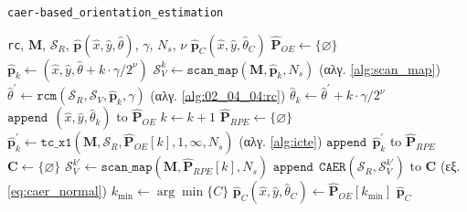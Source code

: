 \begin{algorithm}[!h]
  \caption{\texttt{caer-based\_orientation\_estimation}}
  \begin{spacing}{1.5}
  \begin{algorithmic}[1]
    \REQUIRE \texttt{rc}, $\bm{M}$, $\mathcal{S}_R$, $\hat{\bm{p}}(\hat{x}, \hat{y}, \hat{\theta})$, $\gamma$, $N_s$, $\nu$
    \ENSURE $\hat{\bm{p}}_C(\hat{x}, \hat{y}, \hat{\theta}_C)$
    \STATE {}$\hat{\bm{P}}_{OE} \leftarrow \{\varnothing\}$
      \STATE $\hat{\bm{p}}_k \leftarrow (\hat{x}, \hat{y}, \hat{\theta} + k \cdot \gamma/2^\nu)$
      \STATE $\mathcal{S}_V^k \leftarrow \texttt{scan\_map}(\bm{M}, \hat{\bm{p}}_k, N_s)$ \hfill (αλγ. \ref{alg:scan_map})
      \STATE $\hat{\theta}^\prime \leftarrow \texttt{rcm}(\mathcal{S}_R, \mathcal{S}_V, \hat{\bm{p}}_k, \gamma)$ \hfill (αλγ. \ref{alg:02_04_04:rc})
      \STATE $\hat{\theta}_k \leftarrow \hat{\theta}^\prime + k \cdot \gamma/2^\nu$
      \STATE $\texttt{append} \ \ (\hat{x}, \hat{y}, \hat{\theta}_k)$ to $\hat{\bm{P}}_{OE}$
      \STATE $k \leftarrow k + 1$
    \ENDFOR {}
    \STATE {}$\hat{\bm{P}}_{RPE} \leftarrow \{\varnothing\}$
      \STATE $\hat{\bm{p}}_k^\prime \leftarrow \texttt{tc\_x1}(\bm{M}, \mathcal{S}_R, \hat{\bm{P}}_{OE}[k], 1, \infty, N_s)$ \hfill (αλγ. \ref{alg:icte})
      \STATE $\texttt{append} \ \ \hat{\bm{p}}_k^\prime$ to $\hat{\bm{P}}_{RPE}$
    \ENDFOR{}
    \STATE {}$\bm{C} \leftarrow \{\varnothing\}$
      \STATE $\mathcal{S}_V^{k \prime} \leftarrow \texttt{scan\_map}(\bm{M}, \hat{\bm{P}}_{RPE}[k], N_s)$
      \STATE $\texttt{append} \ \ \texttt{CAER}(\mathcal{S}_R, \mathcal{S}_V^{k \prime})$ to $\bm{C}$ \hfill (εξ. \ref{eq:caer_normal})
    \ENDFOR{}
    \STATE $k_{\min} \leftarrow \arg\min \{C\}$
    \STATE $\hat{\bm{p}}_C(\hat{x}, \hat{y}, \hat{\theta}_C) \leftarrow \hat{\bm{P}}_{OE}[k_{\min}]$
    \RETURN $\hat{\bm{p}}_C$
  \end{algorithmic}
  \end{spacing}
  \label{}
\end{algorithm}


